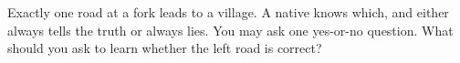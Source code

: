 Exactly one road at a fork leads to a village. A native knows which, and either always tells the truth or always lies. You may ask one yes-or-no question. What should you ask to learn whether the left road is correct?
